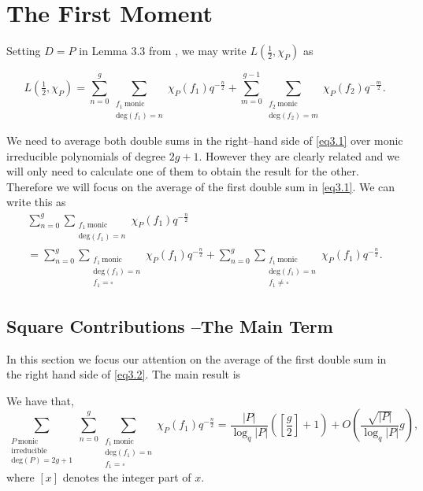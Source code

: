 \documentclass[11pt]{amsart}
\begin{document}
\section{The First Moment}

Setting $D=P$ in Lemma 3.3 from \cite{AK}, we may write $L(\tfrac{1}{2},\chi_{P})$ as

\begin{equation}
\label{eq3.1}
L(\tfrac{1}{2},\chi_{P})=\sum_{n=0}^{g}\sum_{\substack{f_{1} \ \mathrm{monic} \\ \mathrm{deg}(f_{1})=n}}\chi_{P}(f_{1})q^{-\tfrac{n}{2}}+\sum_{m=0}^{g-1}\sum_{\substack{f_{2} \ \mathrm{monic} \\ \mathrm{deg}(f_{2})=m}}\chi_{P}(f_{2})q^{-\tfrac{m}{2}}.
\end{equation}

We need to average both double sums in the right--hand side of \eqref{eq3.1} over monic irreducible polynomials of degree $2g+1$. However they are clearly related and we will only need to calculate one of them to obtain the result for the other. Therefore we will focus on the average of the first double sum in \eqref{eq3.1}. We can write this as
\begin{multline}
\label{eq3.2}
\sum_{n=0}^{g}\sum_{\substack{f_{1} \ \mathrm{monic} \\ \mathrm{deg}(f_{1})=n}}\chi_{P}(f_{1})q^{-\tfrac{n}{2}}\\
=\sum_{n=0}^{g}\sum_{\substack{f_{1} \ \mathrm{monic} \\ \mathrm{deg}(f_{1})=n \\ f_{1}=\square}}\chi_{P}(f_{1})q^{-\tfrac{n}{2}}+\sum_{n=0}^{g}\sum_{\substack{f_{1} \ \mathrm{monic} \\ \mathrm{deg}(f_{1})=n \\ f_{1}\neq\square}}\chi_{P}(f_{1})q^{-\tfrac{n}{2}}.
\end{multline}

\subsection{Square Contributions --The Main Term}
In this section we focus our attention on the average of the first double sum in the right hand side of \eqref{eq3.2}. The main result  is 

\begin{prop}
\label{prop3.1}
We have that,
\begin{equation}
\sum_{\substack{P \ \mathrm{monic} \\ \mathrm{irreducible} \\ \mathrm{deg}(P)=2g+1}}\sum_{n=0}^{g}\sum_{\substack{f_{1} \ \mathrm{monic} \\ \mathrm{deg}(f_{1})=n \\ f_{1}=\square}}\chi_{P}(f_{1})q^{-\tfrac{n}{2}}=\frac{|P|}{\log_{q}|P|}\left(\left[\frac{g}{2}\right]+1\right)+O\left(\frac{\sqrt{|P|}}{\log_{q}|P|}g\right),\nonumber
\end{equation}
where $[x]$ denotes the integer part of $x$.
\end{prop}
\end{document}
